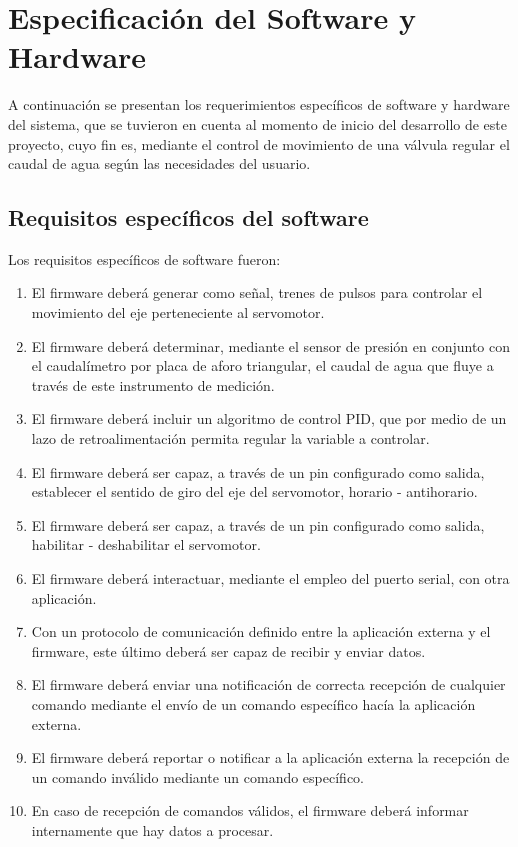 \section{Especificación del Software y Hardware}
\label{sec:ejemplo}
A continuación se presentan los requerimientos específicos de software y hardware del sistema, que se tuvieron en cuenta al momento de inicio del desarrollo de este proyecto, cuyo fin es, mediante el control de movimiento de una válvula regular el caudal de agua según las necesidades del usuario. 
\subsection{Requisitos específicos del software}
\label{subsec:ejemplo}


 Los requisitos específicos de software fueron:

\begin{enumerate}
	\item El firmware deberá generar como señal, trenes de pulsos para controlar el movimiento del eje perteneciente al servomotor.
	\item El firmware deberá determinar, mediante el sensor  de presión en conjunto con el caudalímetro por placa de aforo triangular, el caudal de agua que fluye a través de este instrumento de medición.
	\item  El firmware deberá incluir un algoritmo de control PID, que por medio de un lazo de retroalimentación permita regular la variable a controlar.
	\item El firmware deberá ser capaz, a través de un pin configurado como salida, establecer el sentido de giro del eje del servomotor, horario - antihorario.
	\item El firmware deberá ser capaz, a través de un pin configurado como salida, habilitar - deshabilitar el servomotor.
	\item El firmware deberá interactuar, mediante el empleo del puerto serial, con otra aplicación. 	  
	\item Con un protocolo de comunicación definido entre la aplicación externa y el firmware, este último deberá ser capaz de recibir y enviar datos.
	\item El firmware deberá enviar una notificación de correcta recepción de cualquier comando mediante el envío de un comando específico hacía la aplicación externa.  
	\item El firmware deberá reportar o notificar a la aplicación externa la recepción de un comando inválido mediante un comando específico.
	\item En caso de recepción de comandos válidos, el firmware deberá informar internamente que hay datos a procesar. 
\end{enumerate}

